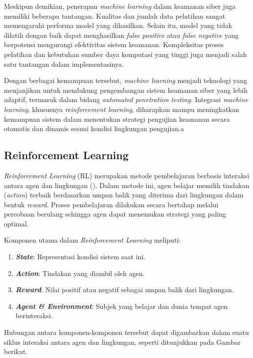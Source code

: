 Meskipun demikian, penerapan \textit{machine learning} dalam keamanan siber juga memiliki beberapa tantangan. Kualitas dan jumlah data pelatihan sangat memengaruhi performa model yang dihasilkan. Selain itu, model yang tidak dilatih dengan baik dapat menghasilkan \textit{false positive} atau \textit{false negative} yang berpotensi mengurangi efektivitas sistem keamanan. Kompleksitas proses pelatihan dan kebutuhan sumber daya komputasi yang tinggi juga menjadi salah satu tantangan dalam implementasinya.

Dengan berbagai kemampuan tersebut, \textit{machine learning} menjadi teknologi yang menjanjikan untuk mendukung pengembangan sistem keamanan siber yang lebih adaptif, termasuk dalam bidang \textit{automated penetration testing}. Integrasi \textit{machine learning}, khususnya \textit{reinforcement learning}, diharapkan mampu meningkatkan kemampuan sistem dalam menentukan strategi pengujian keamanan secara otomatis dan dinamis sesuai kondisi lingkungan pengujian.a

\subsection{Reinforcement Learning}
\textit{Reinforcement Learning} (RL) merupakan metode pembelajaran berbasis interaksi antara agen dan lingkungan (\cite{sutton2018}). Dalam metode ini, agen belajar memilih tindakan (\textit{action}) terbaik berdasarkan umpan balik yang diterima dari lingkungan dalam bentuk \textit{reward}. Proses pembelajaran dilakukan secara bertahap melalui percobaan berulang sehingga agen dapat menemukan strategi yang paling optimal.

Komponen utama dalam \textit{Reinforcement Learning} meliputi:
\begin{enumerate}
    \item \textbf{\textit{State}}: Representasi kondisi sistem saat ini.
    \item \textbf{\textit{Action}}: Tindakan yang diambil oleh agen.
    \item \textbf{\textit{Reward}}: Nilai positif atau negatif sebagai umpan balik dari lingkungan.
    \item \textbf{\textit{Agent \& Environment}}: Subjek yang belajar dan dunia tempat agen berinteraksi.
\end{enumerate}

Hubungan antara komponen-komponen tersebut dapat digambarkan dalam suatu siklus interaksi antara agen dan lingkungan, seperti ditunjukkan pada Gambar berikut.

